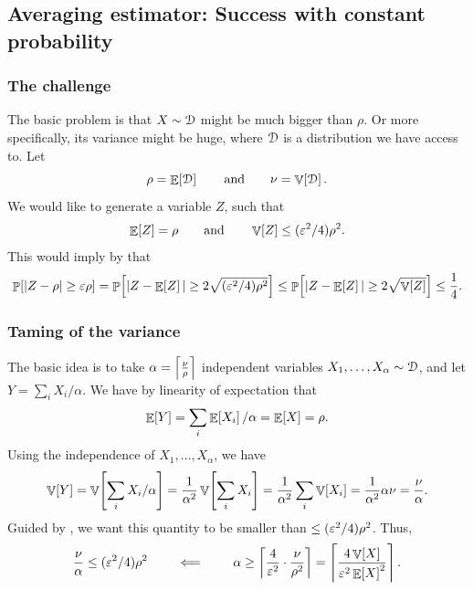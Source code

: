 \subsection{Averaging estimator: Success with constant probability}

\subsubsection{The challenge}

The basic problem is that $X \sim \EuScript{D}$ might be much bigger
than $\rho$. Or more specifically, its variance might be huge, where
$\EuScript{D}$ is a distribution we have access to. Let
\begin{equation*}
    \rho = \mathop{\mathbb{E}}\!\left[ {\EuScript{D}} \right]\qquad\text{and}\qquad
    \nu = \mathop{\mathbb{V}}\!\left[ {\EuScript{D}} \right].
\end{equation*}
 We would like to generate a variable $Z$, such that
\begin{equation}
    \Ex{Z} = \rho%
    \qquad\text{and}\qquad
    \Var{Z} \leq (\eps^2/4) \rho^2.
    \eqlab{small:variance}
\end{equation}
This would imply by  that
\begin{equation*}
    \Prob{ |Z - \rho| \geq \eps \rho}%
    =%
    \Prob{ |Z - \Ex{Z}| \geq 2\sqrt{(\eps^2/4) \rho^2}}
    \leq%
    \Prob{ |Z - \Ex{Z}| \geq 2 \sqrt{\Var{Z}}}%
    \leq \frac{1}{4}.
\end{equation*}


\subsubsection{Taming of the variance}

The basic idea is to take $\alpha = \left\lceil {\frac{\nu}{\rho}} \right\rceil $
independent variables $X_1, \ldots, X_\alpha \sim \EuScript{D}$, and
let $Y = \sum_i X_i / \alpha$. We have by linearity of expectation that
\begin{equation*}
    \mathop{\mathbb{E}}\!\left[ {Y} \right] = \sum_i \mathop{\mathbb{E}}\!\left[ {X_i} \right]/\alpha = \mathop{\mathbb{E}}\!\left[ {X} \right] = \rho.
\end{equation*}
Using the independence of $X_1, \ldots, X_\alpha$, we have
\begin{equation*}
    \Var{Y}%
    =%
    \Var{\sum_i X_i /\alpha}
    =%
    \frac{1}{\alpha^2}\Var{\sum_i X_i}
    =%
    \frac{1}{\alpha^2}\sum_i \Var{X_i}
    =%
    \frac{1}{\alpha^2} \alpha \nu
    =%
    \frac{\nu}{\alpha}.
\end{equation*}
Guided by , we want this quantity to be smaller
than $\leq ({\varepsilon}^2/4) \rho^2$. Thus,
\begin{equation*}
    \frac{\nu}{\alpha}
    \leq (\eps^2/4) \rho^2
    \qquad\impliedby\qquad%
    \alpha \geq \ceil{\frac{4}{\eps^2} \cdot \frac{\nu}{\rho^2}
    }
    = \ceil{ \frac{4 \Var{X}}{\eps^2\Ex{X}^2}
    }.
\end{equation*}

